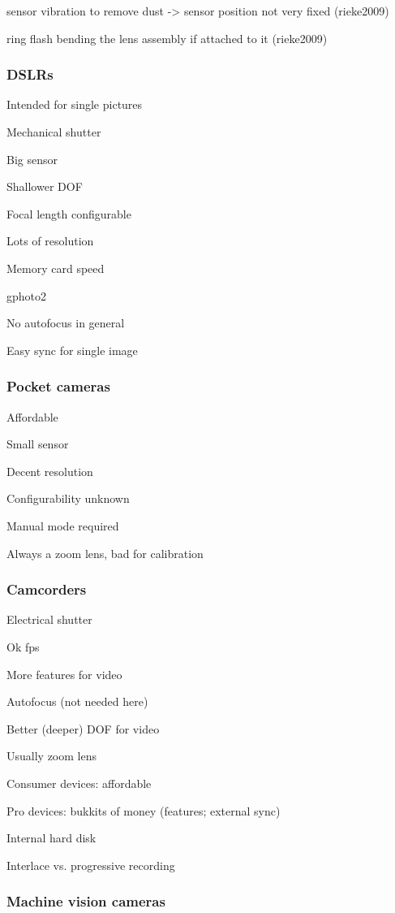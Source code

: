 sensor vibration to remove dust -> sensor position not very fixed (rieke2009)

ring flash bending the lens assembly if attached to it (rieke2009)

\subsubsection{DSLRs}

Intended for single pictures

Mechanical shutter

Big sensor

Shallower DOF

Focal length configurable

Lots of resolution

Memory card speed

gphoto2

No autofocus in general

Easy sync for single image

\subsubsection{Pocket cameras}

Affordable

Small sensor

Decent resolution

Configurability unknown

Manual mode required

Always a zoom lens, bad for calibration


\subsubsection{Camcorders}

Electrical shutter

Ok fps

More features for video

Autofocus (not needed here)

Better (deeper) DOF for video

Usually zoom lens

Consumer devices: affordable

Pro devices: bukkits of money (features; external sync)

Internal hard disk

Interlace vs. progressive recording

\subsubsection{Machine vision cameras}

